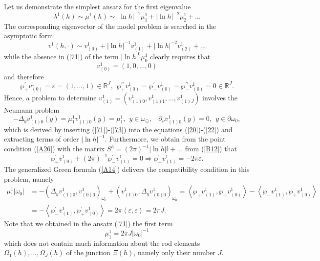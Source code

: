 \documentclass[11pt]{article}%
\numberwithin{equation}{section}
\begin{document}
Let us demonstrate the simplest ansatz for the first eigenvalue%
\begin{equation}
\lambda^{1}(h)\sim\mu^{1}(h)\sim|\ln h|^{-1}\mu_{1}^{1}+|\ln h|^{-2}\mu
_{2}^{1}+... \label{71}%
\end{equation}
The corresponding eigenvector of the model problem is searched in the
asymptotic form%
\begin{equation}
v^{1}(h,\cdot)\sim v_{(0)}^{1}+|\ln h|^{-1}v_{(1)}^{1}+|\ln h|^{-2}v_{(2)}%
^{1}+... \label{72}%
\end{equation}
while the absence in (\ref{71}) of the term $|\ln h|^{0}\mu_{0}^{1}$ clearly
requires that%
\begin{equation}
v_{(0)}^{1}=(1,0,...,0) \label{73}%
\end{equation}
and therefore%
\begin{equation}
\wp_{+}^{\prime}v_{(0)}^{1}=\varepsilon=(1,...,1)\in\mathbb{R}^{J},\ \ \wp
_{+}^{\prime\prime}v_{(0)}^{1}=\wp_{-}^{\prime}v_{(0)}^{1}=\wp_{-}%
^{\prime\prime}v_{(0)}^{1}=0\in\mathbb{R}^{J}. \label{74}%
\end{equation}
Hence, a problem to determine $v_{(1)}^{1}=(v_{(1)0}^{1},v_{(1)1}%
^{1},...,v_{(1)J}^{1})$ involves the Neumann problem%
\begin{equation}
-\Delta_{y}v_{(1)0}^{1}(y)=\mu_{1}^{1}v_{(1)0}^{1}(y)=\mu_{1}^{1}%
,\ \ y\in\omega_{\odot},\ \ \ \ \partial_{\nu}v_{(1)0}^{1}(y)=0,\ \ y\in
\partial\omega_{0}, \label{75}%
\end{equation}
which is derived by inserting (\ref{71})-(\ref{73}) into the equations
(\ref{20})-(\ref{22}) and extracting terms of order $|\ln h|^{-1}$.
Furthermore, we obtain from the point condition (\ref{A26}) with the matrix
$S^{h}=(2\pi)^{-1}|\ln h|\mathbb{I}+...$ from (\ref{B12}) that%
\begin{equation}
\wp_{+}^{\prime}v_{(0)}^{1}+(2\pi)^{-1}\wp_{-}^{\prime}v_{(1)}^{1}%
=0\Rightarrow\wp_{-}^{\prime}v_{(1)}^{1}=-2\pi\varepsilon. \label{76}%
\end{equation}
The generalized Green formula (\ref{A14}) delivers the compatibility condition
in this problem, namely%
\begin{align*}
\mu_{1}^{1}|\omega_{0}|  &  =-(\Delta_{y}v_{(1)0}^{1},v_{(0)0}^{1}%
)_{\omega_{0}}+(v_{(1)0}^{1},\Delta_{y}v_{(0)0}^{1})_{\omega_{0}}=\left\langle
\wp_{+}v_{(1)}^{1},\wp_{-}v_{(0)}^{1}\right\rangle -\left\langle \wp
_{-}v_{(1)}^{1},\wp_{+}v_{(0)}^{1}\right\rangle \\
&  =-\left\langle \wp_{-}^{\prime}v_{(1)}^{1},\wp_{+}^{\prime}v_{(0)}%
^{1}\right\rangle =2\pi\left\langle \varepsilon,\varepsilon\right\rangle =2\pi
J.
\end{align*}
Note that we obtained in the ansatz (\ref{71}) the first term%
\begin{equation}
\mu_{1}^{1}=2\pi J|\omega_{0}|^{-1} \label{77}%
\end{equation}
which does not contain much information about the rod elements $\Omega
_{1}(h),...,\Omega_{J}(h)$ of the junction $\Xi(h)$, namely only their number
$J$.
\end{document}
